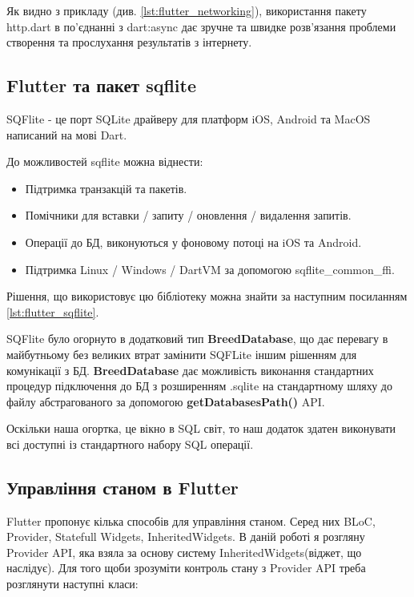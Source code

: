 Як видно з прикладу (див. \ref{lst:flutter_networking}), використання пакету http.dart в по'єднанні з dart:async дає зручне
та швидке розв'язання проблеми створення та прослухання результатів з інтернету.

\subsection{Flutter та пакет sqflite}
\label{subsec:flutter_sqflite_theory}
SQFlite - це порт SQLite драйверу для платформ iOS, Android та MacOS написаний на мові Dart.

До можливостей sqflite можна віднести:

\begin{itemize}
    \item Підтримка транзакцій та пакетів.
    \item Помічники для вставки / запиту / оновлення / видалення запитів.
    \item Операції до БД, виконуються у фоновому потоці на iOS та Android.
    \item Підтримка Linux / Windows / DartVM за допомогою sqflite_common_ffi.
\end{itemize}

Рішення, що використовує цю бібліотеку можна знайти за наступним посиланням \ref{lst:flutter_sqflite}.

SQFlite було огорнуто в додатковий тип \textbf{BreedDatabase},
що дає перевагу в майбутньому без великих втрат замінити SQFLite іншим рішенням для комунікації з БД.
\textbf{BreedDatabase} дає можливість виконання стандартних процедур підключення до БД з розширенням .sqlite
на стандартному шляху до файлу абстрагованого за допомогою \textbf{getDatabasesPath()} API.

Оскільки наша огортка, це вікно в SQL світ, то наш додаток здатен виконувати всі доступні із стандартного набору
SQL операції.

\subsection{Управління станом в Flutter}
\label{subsec:flutter_state_app}
Flutter пропонує кілька способів для управління станом. Серед них BLoC, Provider, Statefull Widgets, InheritedWidgets.
В даній роботі я розгляну Provider API, яка взяла за основу систему InheritedWidgets(віджет, що наслідує).
Для того щоби зрозуміти контроль стану з Provider API треба розглянути наступні класи:

